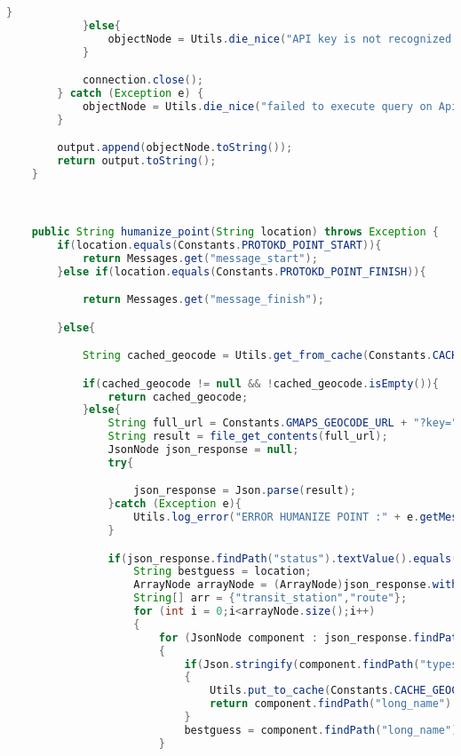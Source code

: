 \begin{lstlisting}[language=Java,basicstyle=\tiny,caption=Application.java]
                }
            }else{
                objectNode = Utils.die_nice("API key is not recognized: " + apikey);
            }

            connection.close();
        } catch (Exception e) {
            objectNode = Utils.die_nice("failed to execute query on Apikey check." + e.getMessage());
        }

        output.append(objectNode.toString());
        return output.toString();
    }



    public String humanize_point(String location) throws Exception {
        if(location.equals(Constants.PROTOKD_POINT_START)){
            return Messages.get("message_start");
        }else if(location.equals(Constants.PROTOKD_POINT_FINISH)){

            return Messages.get("message_finish");

        }else{

            String cached_geocode = Utils.get_from_cache(Constants.CACHE_GEOCODING,location);

            if(cached_geocode != null && !cached_geocode.isEmpty()){
                return cached_geocode;
            }else{
                String full_url = Constants.GMAPS_GEOCODE_URL + "?key="+ Constants.GMAPS_SERVER_KEY + "&latlng=" + location+ "&sensor=false";
                String result = file_get_contents(full_url);
                JsonNode json_response = null;
                try{

                    json_response = Json.parse(result);
                }catch (Exception e){
                    Utils.log_error("ERROR HUMANIZE POINT :" + e.getMessage());
                }

                if(json_response.findPath("status").textValue().equals("OK")){
                    String bestguess = location;
                    ArrayNode arrayNode = (ArrayNode)json_response.withArray("results");
                    String[] arr = {"transit_station","route"};
                    for (int i = 0;i<arrayNode.size();i++)
                    {
                        for (JsonNode component : json_response.findPath("results").get(0).get("address_components"))
                        {
                            if(Json.stringify(component.findPath("types")).contains("transit_station") || Json.stringify(component.findPath("types")).contains("route"))
                            {
                                Utils.put_to_cache(Constants.CACHE_GEOCODING,location,component.findPath("long_name").textValue());
                                return component.findPath("long_name").textValue();
                            }
                            bestguess = component.findPath("long_name").textValue();
                        }


\end{lstlisting}

